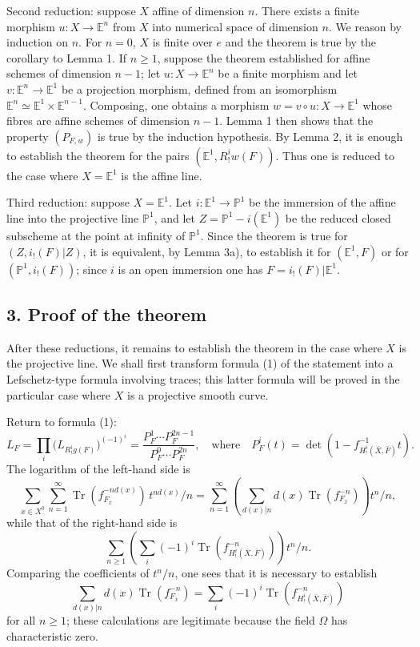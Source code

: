 \documentclass[11pt]{article}
\providecommand{\Tr}{\operatorname{Tr}}
\providecommand{\Tr}{\operatorname{Tr}}
\providecommand{\Tr}{\operatorname{Tr}}
\providecommand{\Tr}{\operatorname{Tr}}
\providecommand{\Tr}{\operatorname{Tr}}
\begin{document}
Second reduction: suppose $X$ affine of dimension $n$. There exists a finite morphism $u:X\to\mathbb E^n$ from $X$ into numerical space of dimension $n$. We reason by induction on $n$. For $n=0$, $X$ is finite over $e$ and the theorem is true by the corollary to Lemma 1. If $n\ge1$, suppose the theorem established for affine schemes of dimension $n-1$; let $u:X\to\mathbb E^n$ be a finite morphism and let $v:\mathbb E^n\to\mathbb E^1$ be a projection morphism, defined from an isomorphism $\mathbb E^n\simeq\mathbb E^1\times\mathbb E^{n-1}$. Composing, one obtains a morphism $w=v\circ u:X\to\mathbb E^1$ whose fibres are affine schemes of dimension $n-1$. Lemma 1 then shows that the property $(P_{F,w})$ is true by the induction hypothesis. By Lemma 2, it is enough to establish the theorem for the pairs $(\mathbb E^1,R^i_!w(F))$. Thus one is reduced to the case where $X=\mathbb E^1$ is the affine line.

Third reduction: suppose $X=\mathbb E^1$. Let $i:\mathbb E^1\to\mathbb P^1$ be the immersion of the affine line into the projective line $\mathbb P^1$, and let $Z=\mathbb P^1-i(\mathbb E^1)$ be the reduced closed subscheme at the point at infinity of $\mathbb P^1$. Since the theorem is true for $(Z,i_!(F)|Z)$, it is equivalent, by Lemma 3a), to establish it for $(\mathbb E^1,F)$ or for $(\mathbb P^1,i_!(F))$; since $i$ is an open immersion one has $F=i_!(F)|\mathbb E^1$.

\subsection*{3. Proof of the theorem}

After these reductions, it remains to establish the theorem in the case where $X$ is the projective line. We shall first transform formula (1) of the statement into a Lefschetz-type formula involving traces; this latter formula will be proved in the particular case where $X$ is a projective smooth curve.

Return to formula (1):
\[
L_F=\prod_i\bigl(L_{R^i_!g(F)}\bigr)^{(-1)^i}
=\frac{P_F^1\cdots P_F^{2n-1}}{P_F^0\cdots P_F^{2n}},
\quad\text{where}\quad
P_F^i(t)=\det(1-f^{-1}_{H^i_!(\bar X,\bar F)}t).
\]
The logarithm of the left-hand side is
\[
\sum_{x\in X^0}\sum_{n=1}^{\infty}\Tr(f_{F_{\bar x}}^{-n d(x)})\,t^{n d(x)}/n
=\sum_{n=1}^{\infty}\left(\sum_{d(x)|n} d(x)\Tr(f_{F_{\bar x}}^{-n})\right)t^n/n,
\]
while that of the right-hand side is
\[
\sum_{n\ge1}\left(\sum_i(-1)^i\Tr(f^{-n}_{H^i_!(\bar X,\bar F)})\right)t^n/n.
\]
Comparing the coefficients of $t^n/n$, one sees that it is necessary to establish
\[
\sum_{d(x)|n}d(x)\Tr(f_{F_{\bar x}}^{-n})
=\sum_i(-1)^i\Tr(f^{-n}_{H^i_!(\bar X,\bar F)})
\tag{2}
\]
for all $n\ge1$; these calculations are legitimate because the field $\Omega$ has characteristic zero.
\end{document}
